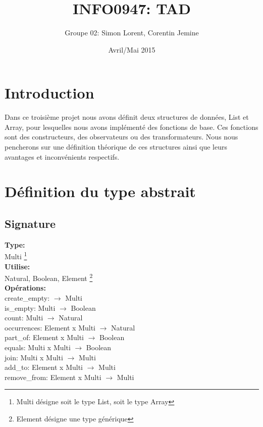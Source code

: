 \documentclass[a4paper, 11pt, oneside]{article}
\begin{document}
	
\newcommand*{\cpl}[1]{\color{mymauve}\hfill\makebox[4.5cm][l]{#1}}

\title{INFO0947: TAD}
\author{Groupe 02: Simon Lorent, Corentin Jemine}
\date{Avril/Mai 2015}

\maketitle
\clearpage

\section{Introduction}
	Dans ce troisième projet nous avons définit deux structures de données, List et Array, pour lesquelles nous avons implémenté des fonctions de base. Ces fonctions sont des constructeurs, des observateurs ou des transformateurs. Nous nous pencherons sur une définition théorique de ces structures ainsi que leurs avantages et inconvénients respectifs.

\section{Définition du type abstrait}
	\subsection{Signature}
	\noindent \textbf{Type:}
	\\ \indent Multi \footnote{Multi désigne soit le type List, soit le type Array}
	\\ \textbf{Utilise:}
	\\ \indent Natural, Boolean, Element \footnote{Element désigne une type générique}
	\\ \textbf{Opérations:}
	\\ \indent create\_empty: $\rightarrow$ Multi
	\\ \indent is\_empty: Multi $\rightarrow$ Boolean
	\\ \indent count: Multi $\rightarrow$ Natural
	\\ \indent occurrences: Element x Multi $\rightarrow$ Natural
	\\ \indent part\_of: Element x Multi $\rightarrow$ Boolean
	\\ \indent equals: Multi x Multi $\rightarrow$ Boolean
	\\ \indent join: Multi x Multi $\rightarrow$ Multi
	\\ \indent add\_to: Element x Multi $\rightarrow$ Multi
	\\ \indent remove\_from: Element x Multi $\rightarrow$ Multi
	
\end{document}
